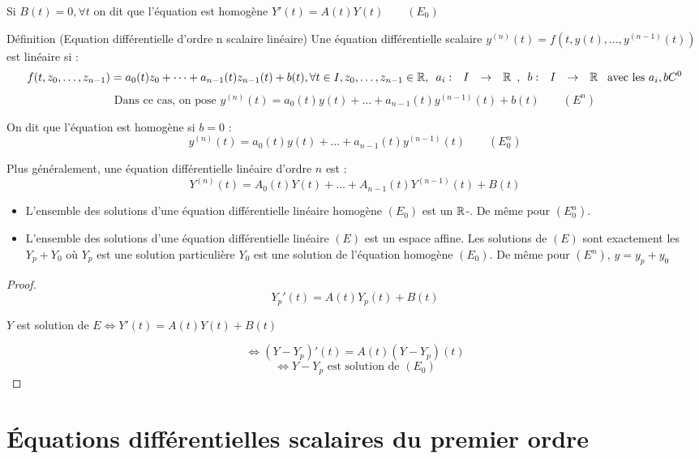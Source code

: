 \documentclass[]{report}
\begin{document}
\begin{re}{}{}
    Si $B(t)=0,\forall t$ on dit que l'équation est homogène $Y'(t)=A(t)Y(t)\qquad (E_0)$
\end{re}

\begin{df}{Définition (Equation différentielle d'ordre n scalaire linéaire)}{}
    Une équation différentielle scalaire $y^{(n)}(t)=f(t,y(t),\dots,y^{(n-1)}(t))$ est linéaire si : $$f(t,z_0,\dots,z_{n-1})=a_0(t)z_0+\dots+a_{n-1}(t)z_{n-1}(t)+b(t),\forall t\in I,z_0,\dots,z_{n-1}\in\mathbb{R},\begin{array}{ccccc} a_i : & I & \to & \mathbb{R} \end{array},\begin{array}{ccccc} b : & I & \to & \mathbb{R} \end{array} \text{ avec les }a_i,b C^0$$
    $$\text{Dans ce cas, on pose }y^{(n)}(t)=a_0(t)y(t)+\dots+a_{n-1}(t)y^{(n-1)}(t)+b(t)\qquad (E^n)$$
\end{df}

\begin{re}{}{}
    On dit que l'équation est homogène si $b=0$ :
    \[y^{(n)}(t)=a_0(t)y(t)+\dots+a_{n-1}(t)y^{(n-1)}(t)\qquad (E_0^n)\]
\end{re}

\begin{re}{}{}
    Plus généralement, une équation différentielle linéaire d'ordre $n$ est :
    \[Y^{(n)}(t)=A_0(t)Y(t)+\ldots+A_{n-1}(t)Y^{(n-1)}(t)+B(t)\]
\end{re}

\begin{prop}{}{}
    \begin{itemize}
        \item L'ensemble des solutions d'une équation différentielle linéaire homogène $(E_0)$ est un $\mathbb{R}$-\ev. De même pour $(E_0^n)$.
        \item L'ensemble des solutions d'une équation différentielle linéaire $(E)$ est un espace affine. Les solutions de $(E)$ sont exactement les $Y_p+Y_0$ où $Y_p$ est une solution particulière $Y_0$ est une solution de l'équation homogène $(E_0)$. De même pour $(E^n)$, $y=y_p+y_0$
    \end{itemize}
\end{prop}

\begin{proof}
    \[Y_p'(t)=A(t)Y_p(t)+B(t)\]
    \begin{center}
        $Y$ est solution de $E\iff Y'(t)=A(t)Y(t)+B(t)$
    \end{center}
    \[\iff (Y-Y_p)'(t)=A(t)(Y-Y_p)(t)\]
    \[\iff Y-Y_p\text{ est solution de }(E_0)\]
\end{proof}

\section{Équations différentielles scalaires du premier ordre}
\end{document}
